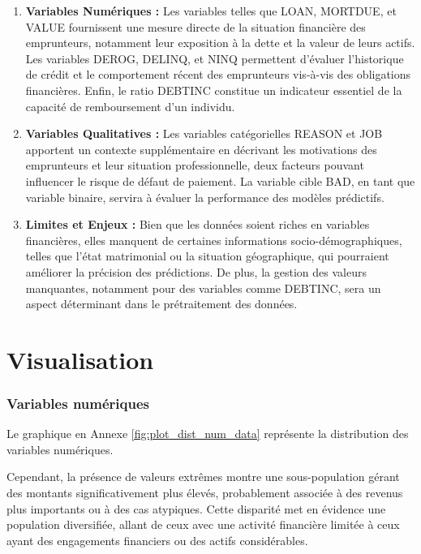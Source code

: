 \documentclass[a4paper,12pt]{report}
\begin{document}
\begin{enumerate}
  \item{ \textbf{Variables Numériques :}\newline
    Les variables telles que {\color{teal} LOAN}, {\color{teal} MORTDUE}, et {\color{teal} VALUE} fournissent une mesure directe de la situation financière des emprunteurs, notamment leur exposition à la dette et la valeur de leurs actifs. 
    Les variables {\color{teal} DEROG}, {\color{teal} DELINQ}, et {\color{teal} NINQ} permettent d’évaluer l’historique de crédit et le comportement récent des emprunteurs vis-à-vis des obligations financières.
    Enfin, le ratio {\color{teal} DEBTINC} constitue un indicateur essentiel de la capacité de remboursement d’un individu.
  }
  \item{ \textbf{Variables Qualitatives :}\newline
    Les variables catégorielles {\color{teal} REASON} et {\color{teal} JOB} apportent un contexte supplémentaire en décrivant les motivations des emprunteurs et leur situation professionnelle, deux facteurs pouvant influencer le risque de défaut de paiement. 
    La variable cible BAD, en tant que variable binaire, servira à évaluer la performance des modèles prédictifs.
  }
  \item{ \textbf{Limites et Enjeux :}\newline
    Bien que les données soient riches en variables financières, elles manquent de certaines informations socio-démographiques, telles que l’état matrimonial ou la situation géographique, qui pourraient améliorer la précision des prédictions. 
    De plus, la gestion des valeurs manquantes, notamment pour des variables comme {\color{teal} DEBTINC}, sera un aspect déterminant dans le prétraitement des données.
  }
\end{enumerate}

\section{Visualisation}

\subsubsection{Variables numériques}

Le graphique en Annexe \ref{fig:plot_dist_num_data} représente la distribution des variables numériques.

Cependant, la présence de valeurs extrêmes montre une sous-population gérant des montants significativement plus élevés, probablement associée à des revenus plus importants ou à des cas atypiques.
Cette disparité met en évidence une population diversifiée, allant de ceux avec une activité financière limitée à ceux ayant des engagements financiers ou des actifs considérables.
\end{document}
